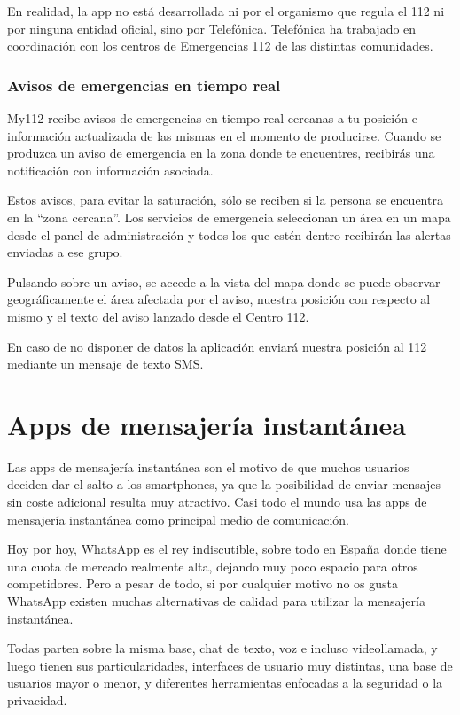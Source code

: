 En realidad, la app no está desarrollada ni por el organismo que regula el 112 ni por ninguna entidad oficial, sino por Telefónica. Telefónica ha trabajado en coordinación con los centros de Emergencias 112 de las distintas comunidades.

\subsubsection{Avisos de emergencias en tiempo real}

My112 recibe avisos de emergencias en tiempo real cercanas a tu posición e información actualizada de las mismas en el momento de producirse. Cuando se produzca un aviso de emergencia en la zona donde te encuentres, recibirás una notificación con información asociada.

Estos avisos, para evitar la saturación, sólo se reciben si la persona se encuentra en la “zona cercana”. Los servicios de emergencia seleccionan un área en un mapa desde el panel de administración y todos los que estén dentro recibirán las alertas enviadas a ese grupo.

Pulsando sobre un aviso, se accede a la vista del mapa donde se puede observar geográficamente el área afectada por el aviso, nuestra posición con respecto al mismo y el texto del aviso lanzado desde el Centro 112.

En caso de no disponer de datos la aplicación enviará nuestra posición al 112 mediante un mensaje de texto SMS.

\section{Apps de mensajería instantánea}

Las apps de mensajería instantánea son el motivo de que muchos usuarios deciden dar el salto a los smartphones, ya que la posibilidad de enviar mensajes sin coste adicional resulta muy atractivo. Casi todo el mundo usa las apps de mensajería instantánea como principal medio de comunicación.

Hoy por hoy, WhatsApp es el rey indiscutible, sobre todo en España donde tiene una cuota de mercado realmente alta, dejando muy poco espacio para otros competidores. Pero a pesar de todo, si por cualquier motivo no os gusta WhatsApp existen muchas alternativas de calidad para utilizar la mensajería instantánea.

Todas parten sobre la misma base, chat de texto, voz e incluso videollamada, y luego tienen sus particularidades, interfaces de usuario muy distintas, una base de usuarios mayor o menor, y diferentes herramientas enfocadas a la seguridad o la privacidad.

